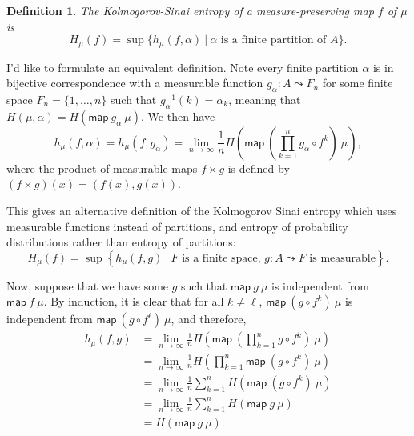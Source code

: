 \documentclass{article}           %
\newtheorem{definition}{Definition}
\newcommand{\map}[2]{\mathsf{map}\ {#1}\ {#2}}
\newcommand{\suchthat}{\ |\ }
\begin{document}
\begin{definition}
The \emph{Kolmogorov-Sinai entropy} of a measure-preserving map $f$ of $\mu$ is
\[
H_\mu(f) = \sup \{ h_\mu(f, \alpha) \suchthat \text{$\alpha$ is a finite partition of $A$} \}.
\]
\end{definition}

I'd like to formulate an equivalent definition. Note every finite partition $\alpha$ is in bijective correspondence with a measurable function $g_\alpha : A \leadsto F_n$ for some finite space $F_n = \{1, \ldots, n \}$ such that $g_\alpha^{-1}(k) = \alpha_k$, meaning that $H(\mu, \alpha) = H(\map{g_\alpha}{\mu})$. We then have
\[
h_\mu(f, \alpha) = h_\mu(f, g_\alpha) = \lim_{n \to \infty} \frac{1}{n} H\left( \map{\left(\prod_{k = 1}^n g_\alpha \circ f^k\right)} \mu \right),
\]
where the product of measurable maps $f \times g$ is defined by $(f \times g)(x) = (f(x), g(x))$.

This gives an alternative definition of the Kolmogorov Sinai entropy which uses measurable functions instead of partitions, and entropy of probability distributions rather than entropy of partitions:
\[
H_\mu(f) = \sup \left\{ h_\mu(f, g) \suchthat \text{$F$ is a finite space, $g : A \leadsto F$ is measurable} \right\}.
\]

Now, suppose that we have some $g$ such that $\map{g}{\mu}$ is independent from $\map{f}{\mu}$. By induction, it is clear that for all $k \ne \ell$, $\map{(g \circ f^k)}{\mu}$ is independent from $\map{(g \circ f^\ell)}{\mu}$, and therefore,
\begin{align*}
h_\mu(f, g) 
&= \lim_{n \to \infty} \frac{1}{n} H\left( \map{\left(\prod_{k = 1}^n g \circ f^k\right)} \mu \right)
\\ &= \lim_{n \to \infty} \frac{1}{n} H\left( \prod_{k = 1}^n \map{(g \circ f^k)}{\mu} \right)
\\ &= \lim_{n \to \infty} \frac{1}{n} \sum_{k = 1}^n H\left( \map{(g \circ f^k)}{\mu} \right)
\\ &= \lim_{n \to \infty} \frac{1}{n} \sum_{k = 1}^n H\left( \map{g}{\mu} \right)
\\ &= H(\map{g}{\mu}).
\end{align*}
\end{document}
